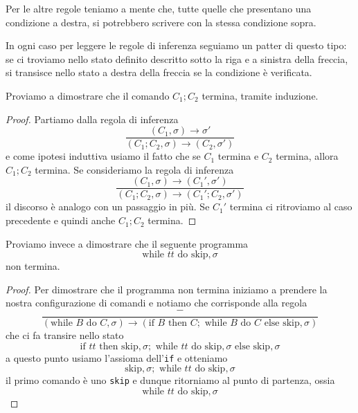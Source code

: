Per le altre regole teniamo a mente che, tutte quelle che
presentano una condizione a destra, si potrebbero scrivere
con la stessa condizione sopra.

In ogni caso per leggere le regole di inferenza seguiamo un
patter di questo tipo: se ci troviamo nello stato definito
descritto sotto la riga e a sinistra della freccia, si
transisce nello stato a destra della freccia se la condizione
è verificata.

\begin{example}
	Proviamo a dimostrare che il comando $C_1 ; C_2$ termina,
	tramite induzione.
	\begin{proof}
		Partiamo dalla regola di inferenza
		\[
			\frac{(C_1, \sigma) \to \sigma'}
			{(C_1 ; C_2, \sigma) \to (C_2 , \sigma')}
		\]
		e come ipotesi induttiva usiamo il fatto che se
		$C_1$ termina e $C_2$ termina, allora $C_1 ; C_2$
		termina. Se consideriamo la regola di inferenza
		\[
			\frac{(C_1, \sigma) \to (C_1', \sigma')}
			{(C_1 ; C_2, \sigma) \to (C_1' ; C_2 , \sigma')}
		\]
		il discorso è analogo con un passaggio in più. Se
		$C_1'$ termina ci ritroviamo al caso precedente e
		quindi anche $C_1 ; C_2$ termina.
	\end{proof}
\end{example}

\begin{example}
	Proviamo invece a dimostrare che il seguente programma
	\[ \text{while } tt \text{ do} \text{ skip}, \sigma \]
	non termina.
	\begin{proof}
		Per dimostrare che il programma non termina iniziamo
		a prendere la nostra configurazione di comandi e
		notiamo che corrisponde alla regola
		\[
			\frac{-}{(\text{while } B \text{ do } C, \sigma)
				\to (\text{if } B \text{ then } C;
				\text{ while } B \text{ do } C
				\text{ else skip}, \sigma )}
		\]
		che ci fa transire nello stato
		\[
			\text{if } tt \text{ then skip}, \sigma;
			\text{ while } tt \text{ do skip}, \sigma
			\text{ else skip}, \sigma
		\]
		a questo punto usiamo l'assioma dell'\verb|if| e
		otteniamo
		\[
			\text{skip}, \sigma ; \text{ while } tt
			\text{ do skip}, \sigma
		\]
		il primo comando è uno \verb|skip| e dunque ritorniamo
		al punto di partenza, ossia
		\[ \text{while } tt \text{ do} \text{ skip}, \sigma \]
	\end{proof}
\end{example}
